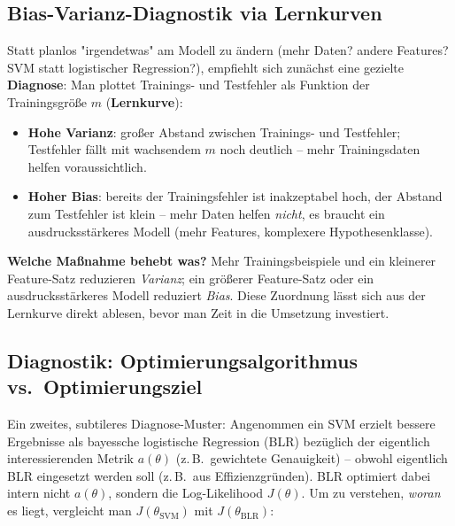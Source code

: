 \documentclass[11pt]{article}
\theoremstyle{csthm}
\theoremstyle{csdef}
\begin{document}
\subsection{Bias-Varianz-Diagnostik via Lernkurven}

Statt planlos "irgendetwas" am Modell zu ändern (mehr Daten? andere
Features? SVM statt logistischer Regression?), empfiehlt sich zunächst
eine gezielte \textbf{Diagnose}: Man plottet Trainings- und Testfehler als
Funktion der Trainingsgröße $m$ (\textbf{Lernkurve}):

\begin{itemize}
  \item \textbf{Hohe Varianz}: großer Abstand zwischen Trainings- und
        Testfehler; Testfehler fällt mit wachsendem $m$ noch deutlich --
        mehr Trainingsdaten helfen voraussichtlich.
  \item \textbf{Hoher Bias}: bereits der Trainingsfehler ist inakzeptabel
        hoch, der Abstand zum Testfehler ist klein -- mehr Daten helfen
        \emph{nicht}, es braucht ein ausdrucksstärkeres Modell (mehr
        Features, komplexere Hypothesenklasse).
\end{itemize}

\begin{tcolorbox}[defstyle]
\textbf{Welche Maßnahme behebt was?} Mehr Trainingsbeispiele und ein
kleinerer Feature-Satz reduzieren \emph{Varianz}; ein größerer Feature-Satz
oder ein ausdrucksstärkeres Modell reduziert \emph{Bias}. Diese Zuordnung
lässt sich aus der Lernkurve direkt ablesen, bevor man Zeit in die
Umsetzung investiert.
\end{tcolorbox}

\subsection{Diagnostik: Optimierungsalgorithmus vs.\ Optimierungsziel}

Ein zweites, subtileres Diagnose-Muster: Angenommen ein SVM erzielt bessere
Ergebnisse als bayessche logistische Regression (BLR) bezüglich der
eigentlich interessierenden Metrik $a(\theta)$ (z.\,B.\ gewichtete
Genauigkeit) -- obwohl eigentlich BLR eingesetzt werden soll (z.\,B.\ aus
Effizienzgründen). BLR optimiert dabei intern nicht $a(\theta)$, sondern die
Log-Likelihood $J(\theta)$. Um zu verstehen, \emph{woran} es liegt, vergleicht
man $J(\theta_\text{SVM})$ mit $J(\theta_\text{BLR})$:
\end{document}
